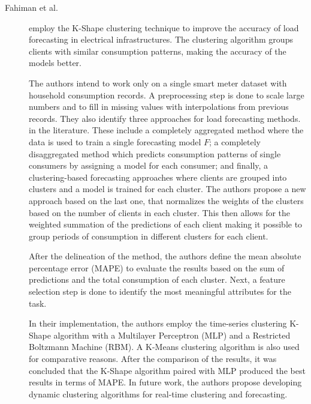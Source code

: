 \begin{description}
    \item[Fahiman et al.]\cite{Fahiman.Erfani.ea_Improvingloadforecasting_2017} employ the K-Shape clustering technique to improve the accuracy of load forecasting in electrical infrastructures. The clustering algorithm groups clients with similar consumption patterns, making the accuracy of the models better. 
    
    The authors intend to work only on a single smart meter dataset with household consumption records. A preprocessing step is done to scale large numbers and to fill in missing values with interpolations from previous records. They also identify three approaches for load forecasting methods. in the literature. These include a completely aggregated method where the data is used to train a single forecasting model $F$; a completely disaggregated method which predicts consumption patterns of single consumers by assigning a model for each consumer; and finally, a clustering-based forecasting approaches where clients are grouped into clusters and a model is trained for each cluster. The authors propose a new approach based on the last one, that normalizes the weights of the clusters based on the number of clients in each cluster. This then allows for the weighted summation of the predictions of each client making it possible to group periods of consumption in different clusters for each client.

    After the delineation of the method, the authors define the mean absolute percentage error (MAPE) to evaluate the results based on the sum of predictions and the total consumption of each cluster. Next, a feature selection step is done to identify the most meaningful attributes for the task. 

    In their implementation, the authors employ the time-series clustering K-Shape algorithm with a Multilayer Perceptron (MLP) and a Restricted Boltzmann Machine (RBM). A K-Means clustering algorithm is also used for comparative reasons. After the comparison of the results, it was concluded that the K-Shape algorithm paired with MLP produced the best results in terms of MAPE. In future work, the authors propose developing dynamic clustering algorithms for real-time clustering and forecasting.
\end{description}

